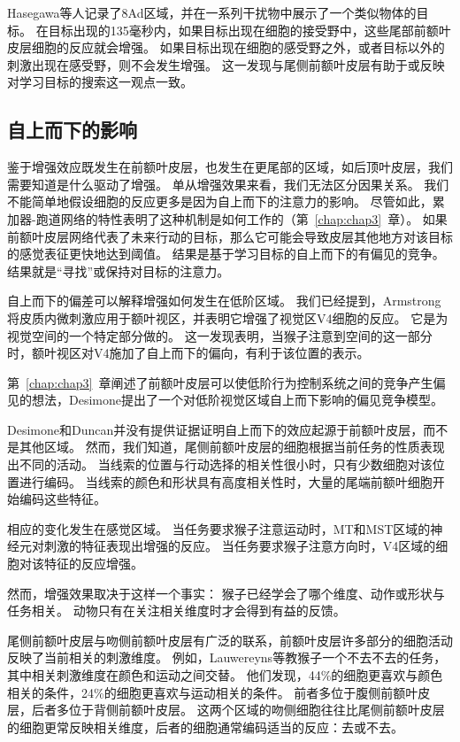 Hasegawa等人\cite{hasegawa2000search}记录了8Ad区域，并在一系列干扰物中展示了一个类似物体的目标。
在目标出现的135毫秒内，如果目标出现在细胞的接受野中，这些尾部前额叶皮层细胞的反应就会增强。
如果目标出现在细胞的感受野之外，或者目标以外的刺激出现在感受野，则不会发生增强。
这一发现与尾侧前额叶皮层有助于或反映对学习目标的搜索这一观点一致。



\subsection{自上而下的影响}

鉴于增强效应既发生在前额叶皮层，也发生在更尾部的区域，如后顶叶皮层，我们需要知道是什么驱动了增强。
单从增强效果来看，我们无法区分因果关系。
我们不能简单地假设细胞的反应更多是因为自上而下的注意力的影响。
尽管如此，累加器-跑道网络的特性表明了这种机制是如何工作的（第~\ref{chap:chap3}~章）。
如果前额叶皮层网络代表了未来行动的目标，那么它可能会导致皮层其他地方对该目标的感觉表征更快地达到阈值。
结果是基于学习目标的自上而下的有偏见的竞争\cite{desimone1995neural}。
结果就是“寻找”或保持对目标的注意力。


自上而下的偏差可以解释增强如何发生在低阶区域。
我们已经提到，Armstrong\cite{armstrong2007rapid}将皮质内微刺激应用于额叶视区，并表明它增强了视觉区V4细胞的反应。
它是为视觉空间的一个特定部分做的。
这一发现表明，当猴子注意到空间的这一部分时，额叶视区对V4施加了自上而下的偏向，有利于该位置的表示。


第~\ref{chap:chap3}~章阐述了前额叶皮层可以使低阶行为控制系统之间的竞争产生偏见的想法，Desimone\cite{desimone1995neural}提出了一个对低阶视觉区域自上而下影响的偏见竞争模型。


Desimone和Duncan并没有提供证据证明自上而下的效应起源于前额叶皮层，而不是其他区域。
然而，我们知道，尾侧前额叶皮层的细胞根据当前任务的性质表现出不同的活动。
当线索的位置与行动选择的相关性很小时，只有少数细胞对该位置进行编码\cite{chen2001neuronal}。
当线索的颜色和形状具有高度相关性时，大量的尾端前额叶细胞开始编码这些特征\cite{bichot1996visual}。


相应的变化发生在感觉区域。
当任务要求猴子注意运动时，MT和MST区域的神经元对刺激的特征表现出增强的反应\cite{treue1996attentional}。
当任务要求猴子注意方向时，V4区域的细胞对该特征的反应增强\cite{mcadams1999effects}。


然而，增强效果取决于这样一个事实：
猴子已经学会了哪个维度、动作或形状与任务相关。
动物只有在关注相关维度时才会得到有益的反馈。


尾侧前额叶皮层与吻侧前额叶皮层有广泛的联系，前额叶皮层许多部分的细胞活动反映了当前相关的刺激维度。
例如，Lauwereyns等\cite{lauwereyns2001responses}教猴子一个不去不去的任务，其中相关刺激维度在颜色和运动之间交替。
他们发现，44\%的细胞更喜欢与颜色相关的条件，24\%的细胞更喜欢与运动相关的条件。
前者多位于腹侧前额叶皮层，后者多位于背侧前额叶皮层。
这两个区域的吻侧细胞往往比尾侧前额叶皮层的细胞更常反映相关维度，后者的细胞通常编码适当的反应：去或不去。


